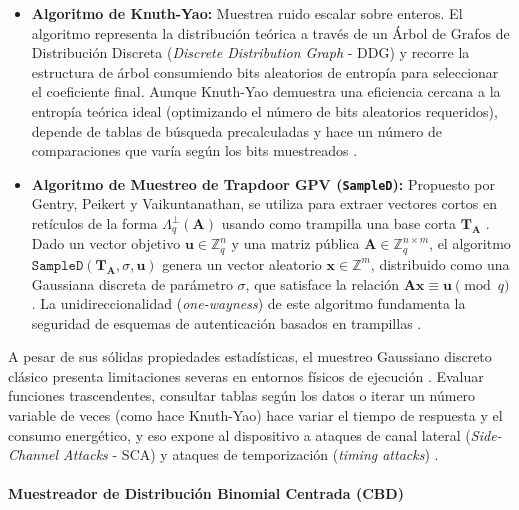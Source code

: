 \begin{itemize}
    \item \textbf{Algoritmo de Knuth-Yao:} Muestrea ruido escalar sobre enteros. El algoritmo representa la distribución teórica a través de un Árbol de Grafos de Distribución Discreta (\textit{Discrete Distribution Graph} - DDG) \cite{nguyen2019high} y recorre la estructura de árbol consumiendo bits aleatorios de entropía para seleccionar el coeficiente final. Aunque Knuth-Yao demuestra una eficiencia cercana a la entropía teórica ideal (optimizando el número de bits aleatorios requeridos), depende de tablas de búsqueda precalculadas y hace un número de comparaciones que varía según los bits muestreados \cite{nguyen2019high}.

    \item \textbf{Algoritmo de Muestreo de Trapdoor GPV (\texttt{SampleD}):} Propuesto por Gentry, Peikert y Vaikuntanathan, se utiliza para extraer vectores cortos en retículos de la forma $\Lambda_q^\perp(\mathbf{A})$ usando como trampilla una base corta $\mathbf{T}_{\mathbf{A}}$ \cite{huang2018lattice}. Dado un vector objetivo $\mathbf{u} \in \mathbb{Z}_q^n$ y una matriz pública $\mathbf{A} \in \mathbb{Z}_q^{n \times m}$, el algoritmo $\texttt{SampleD}(\mathbf{T}_{\mathbf{A}}, \sigma, \mathbf{u})$ genera un vector aleatorio $\mathbf{x} \in \mathbb{Z}^m$, distribuido como una Gaussiana discreta de parámetro $\sigma$, que satisface la relación $\mathbf{A}\mathbf{x} \equiv \mathbf{u} \pmod q$ \cite{huang2018lattice}. La unidireccionalidad (\textit{one-wayness}) de este algoritmo fundamenta la seguridad de esquemas de autenticación basados en trampillas \cite{huang2018lattice}.
\end{itemize}

A pesar de sus sólidas propiedades estadísticas, el muestreo Gaussiano discreto clásico presenta limitaciones severas en entornos físicos de ejecución \cite{mukil2026implementing, yang2025multiserver}. Evaluar funciones trascendentes, consultar tablas según los datos o iterar un número variable de veces (como hace Knuth-Yao) hace variar el tiempo de respuesta y el consumo energético, y eso expone al dispositivo a ataques de canal lateral (\textit{Side-Channel Attacks} - SCA) y ataques de temporización (\textit{timing attacks}) \cite{mukil2026implementing}.

\paragraph{Muestreador de Distribución Binomial Centrada (CBD)}
\label{sec:cbd}

